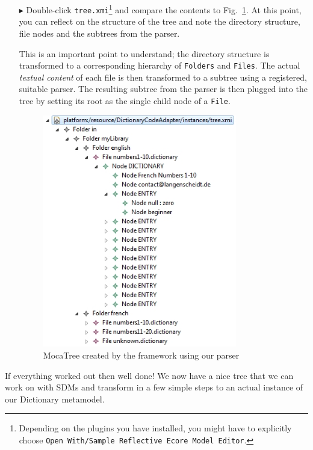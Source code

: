 \begin{enumerate}
  \item[$\blacktriangleright$] Double-click \texttt{tree.xmi}\footnote{Depending on the plugins you have installed, you might have to explicitly choose \texttt{Open With/Sample Reflective Ecore Model Editor}.} and compare the contents to Fig.~\ref{fig:moca-10-ParseResult2}. At this point, you can reflect on the structure of the tree and note the directory structure, file nodes and the subtrees from the parser.
  
This is an important point to understand; the directory structure is transformed to a corresponding hierarchy of \texttt{Folders} and \texttt{Files}.
The actual \emph{textual content} of each file is then transformed to a subtree using a registered, suitable parser.
The resulting subtree from the parser is then plugged into the tree by setting its root as the single child node of a \texttt{File}.
\begin{figure}[!htbp]
\begin{center}
 \includegraphics[width=0.8\textwidth]{pics/moca/2TextToMocaTree/10-ParseResult2}
  \caption{MocaTree created by the framework using our parser}
  \label{fig:moca-10-ParseResult2}
\end{center}
\end{figure}
\end{enumerate}

If everything worked out then well done!  We now have a nice tree that we can work on with SDMs and transform in a few simple steps to an actual instance of our Dictionary metamodel.

\clearpage